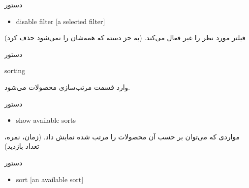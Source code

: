 \documentclass[]{article}
\begin{document}
\begin{mybox}[colback=brilliantlavender]{دستور}

\begin{latin}

\begin{itemize}[label = {$\Rightarrow$}]

\item
disable filter [a selected filter]

\end{itemize}

\end{latin}

\end{mybox}

فیلتر مورد نظر را غیر فعال می‌کند. (به جز دسته که همه‌شان را نمی‌شود حذف کرد)

\hrulefill

\begin{mybox}[colback=yellow]{دستور}

\begin{latin}

sorting

\end{latin}

\end{mybox}

وارد قسمت مرتب‌سازی محصولات می‌شود.



\begin{mybox}[colback=brilliantlavender]{دستور}

\begin{latin}

\begin{itemize}[label = {$\Rightarrow$}]

\item
show available sorts

\end{itemize}

\end{latin}

\end{mybox}

مواردی که می‌توان بر حسب آن محصولات را مرتب شده نمایش داد. (زمان، نمره، تعداد بازدید)



\begin{mybox}[colback=brilliantlavender]{دستور}

\begin{latin}

\begin{itemize}[label = {$\Rightarrow$}]

\item
sort [an available sort]

\end{itemize}

\end{latin}

\end{mybox}
\end{document}

